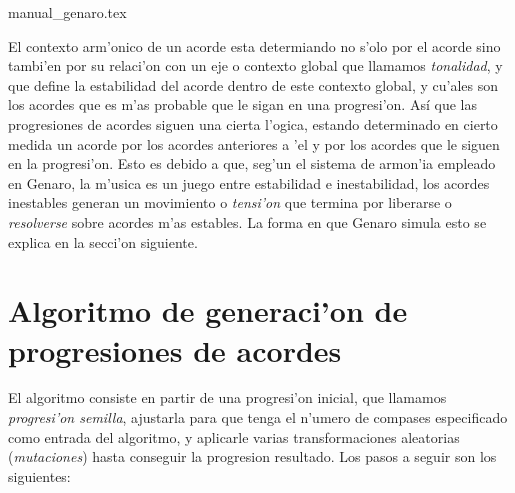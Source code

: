 ﻿manual_genaro.tex\documentclass[a4paper,12pt]{article}
\begin{document}
El contexto arm'onico de un acorde esta determiando no s'olo por el acorde sino tambi'en por su relaci'on con un eje o contexto global que llamamos \emph{tonalidad}, y que define la estabilidad del acorde dentro de este contexto global, y cu'ales son los acordes que es m'as probable que le sigan en una progresi'on. Así que las progresiones de acordes siguen una cierta l'ogica, estando determinado en cierto medida un acorde por los acordes anteriores a 'el y por los acordes que le siguen en la progresi'on. Esto es debido a que, seg'un el sistema de armon'ia empleado en Genaro, la m'usica es un juego entre estabilidad e inestabilidad, los acordes inestables generan un movimiento o \emph{tensi'on} que termina por liberarse o \emph{resolverse} sobre acordes m'as estables. La forma en que Genaro simula esto se explica en la secci'on siguiente.

\section {Algoritmo de generaci'on de progresiones de acordes}
El algoritmo consiste en partir de una progresi'on inicial, que llamamos \emph{progresi'on semilla}, ajustarla para que tenga el n'umero de compases especificado como entrada del algoritmo, y aplicarle varias transformaciones aleatorias (\emph{mutaciones}) hasta conseguir la progresion resultado. Los pasos a seguir son los siguientes:
\end{document}
